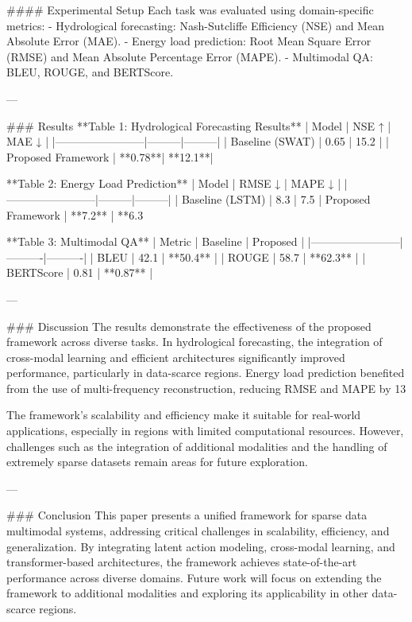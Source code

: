 #### Experimental Setup
Each task was evaluated using domain-specific metrics:
- Hydrological forecasting: Nash-Sutcliffe Efficiency (NSE) and Mean Absolute Error (MAE).
- Energy load prediction: Root Mean Square Error (RMSE) and Mean Absolute Percentage Error (MAPE).
- Multimodal QA: BLEU, ROUGE, and BERTScore.

---

### Results
**Table 1: Hydrological Forecasting Results**
| Model                  | NSE ↑   | MAE ↓   |
|------------------------|---------|---------|
| Baseline (SWAT)        | 0.65    | 15.2    |
| Proposed Framework     | **0.78**| **12.1**|

**Table 2: Energy Load Prediction**
| Model                  | RMSE ↓  | MAPE ↓  |
|------------------------|---------|---------|
| Baseline (LSTM)        | 8.3     | 7.5%
| Proposed Framework     | **7.2** | **6.3%

**Table 3: Multimodal QA**
| Metric                 | Baseline | Proposed |
|------------------------|----------|----------|
| BLEU                   | 42.1     | **50.4** |
| ROUGE                  | 58.7     | **62.3** |
| BERTScore              | 0.81     | **0.87** |

---

### Discussion
The results demonstrate the effectiveness of the proposed framework across diverse tasks. In hydrological forecasting, the integration of cross-modal learning and efficient architectures significantly improved performance, particularly in data-scarce regions. Energy load prediction benefited from the use of multi-frequency reconstruction, reducing RMSE and MAPE by 13%

The framework's scalability and efficiency make it suitable for real-world applications, especially in regions with limited computational resources. However, challenges such as the integration of additional modalities and the handling of extremely sparse datasets remain areas for future exploration.

---

### Conclusion
This paper presents a unified framework for sparse data multimodal systems, addressing critical challenges in scalability, efficiency, and generalization. By integrating latent action modeling, cross-modal learning, and transformer-based architectures, the framework achieves state-of-the-art performance across diverse domains. Future work will focus on extending the framework to additional modalities and exploring its applicability in other data-scarce regions.

